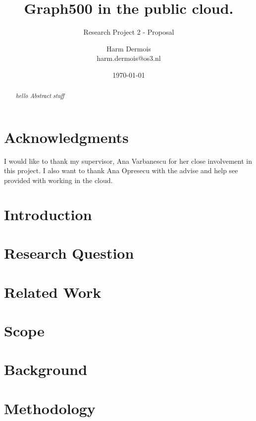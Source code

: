 \documentclass[A4]{scrartcl}
\begin{document}
\title{Graph500 in the public cloud.}
\subtitle{Research Project 2 - Proposal}
\date{\today}
\author{Harm Dermois \\ harm.dermois@os3.nl}

\maketitle
\newpage


\begin{abstract}
\textit{hello Abstract stuff}
\end{abstract}

\newpage

\section*{Acknowledgments}
I would like to thank my supervisor, Ana Varbanescu for her close involvement in this project. I also want to thank Ana Opresecu with the advise and help see provided with working in the cloud.

\tableofcontents
\newpage




\section{Introduction}
\label{sec:introduction}



\section{Research Question}
\label{research-questions}



\section{Related Work}
\label{related-work}



\section{Scope}
\label{scope}


\section{Background}
\label{background}


\section{Methodology}
\label{methodology}

\end{document}
